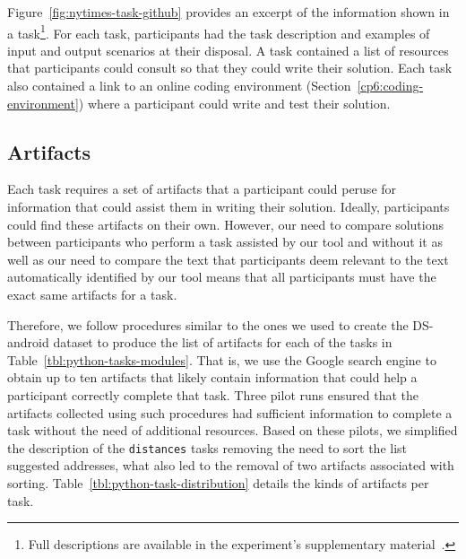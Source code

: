 Figure~\ref{fig:nytimes-task-github} provides an excerpt of the information shown in a task\footnote{Full descriptions are available in the experiment's supplementary material~\cite{cp6_supplementary_material}.}.
For each task, participants had the task description and examples of input and output scenarios at their disposal. A task contained a list of resources that participants could consult 
so that they could write their solution.
Each task also contained a link to an online coding environment (Section~\ref{cp6:coding-environment})
where a participant could write and test their solution. 









\subsection{Artifacts}
\label{cp6:experiment-artifacts}




Each task requires a set of artifacts that a participant could peruse for information that could assist them in writing their solution.
Ideally, participants could find these artifacts on their own. However, our need to compare solutions between participants who perform a task 
assisted by our tool and without it as well as our need to compare the text that participants deem relevant to the text
automatically identified by our tool means that all participants must have the exact same artifacts for a task.


Therefore,
we follow procedures similar to the ones we used to create the \acs{DS-android} dataset to produce the list of artifacts for each of the tasks in Table~\ref{tbl:python-tasks-modules}. 
That is, we use the Google search engine to obtain up to ten artifacts that likely contain 
information that could help a participant correctly complete that task. 
Three pilot runs ensured that the artifacts collected using such procedures had sufficient information to complete a task without 
the need of additional resources. Based on these pilots, we simplified the description of the \texttt{distances} tasks removing the need to sort the list suggested addresses, what also led to the removal of two artifacts associated with sorting. Table~\ref{tbl:python-task-distribution} details the kinds of artifacts per task.



